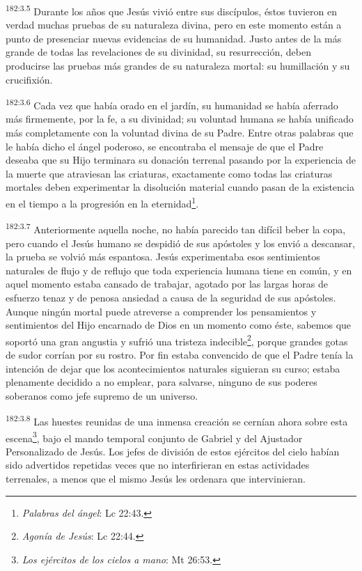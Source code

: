 \par 
\textsuperscript{182:3.5} Durante los años que Jesús vivió entre sus discípulos, éstos tuvieron en verdad muchas pruebas de su naturaleza divina, pero en este momento están a punto de presenciar nuevas evidencias de su humanidad. Justo antes de la más grande de todas las revelaciones de su divinidad, su resurrección, deben producirse las pruebas más grandes de su naturaleza mortal: su humillación y su crucifixión.

\par 
\textsuperscript{182:3.6} Cada vez que había orado en el jardín, su humanidad se había aferrado más firmemente, por la fe, a su divinidad; su voluntad humana se había unificado más completamente con la voluntad divina de su Padre. Entre otras palabras que le había dicho el ángel poderoso, se encontraba el mensaje de que el Padre deseaba que su Hijo terminara su donación terrenal pasando por la experiencia de la muerte que atraviesan las criaturas, exactamente como todas las criaturas mortales deben experimentar la disolución material cuando pasan de la existencia en el tiempo a la progresión en la eternidad\footnote{\textit{Palabras del ángel}: Lc 22:43.}.

\par 
\textsuperscript{182:3.7} Anteriormente aquella noche, no había parecido tan difícil beber la copa, pero cuando el Jesús humano se despidió de sus apóstoles y los envió a descansar, la prueba se volvió más espantosa. Jesús experimentaba esos sentimientos naturales de flujo y de reflujo que toda experiencia humana tiene en común, y en aquel momento estaba cansado de trabajar, agotado por las largas horas de esfuerzo tenaz y de penosa ansiedad a causa de la seguridad de sus apóstoles. Aunque ningún mortal puede atreverse a comprender los pensamientos y sentimientos del Hijo encarnado de Dios en un momento como éste, sabemos que soportó una gran angustia y sufrió una tristeza indecible\footnote{\textit{Agonía de Jesús}: Lc 22:44.}, porque grandes gotas de sudor corrían por su rostro. Por fin estaba convencido de que el Padre tenía la intención de dejar que los acontecimientos naturales siguieran su curso; estaba plenamente decidido a no emplear, para salvarse, ninguno de sus poderes soberanos como jefe supremo de un universo.

\par 
\textsuperscript{182:3.8} Las huestes reunidas de una inmensa creación se cernían ahora sobre esta escena\footnote{\textit{Los ejércitos de los cielos a mano}: Mt 26:53.}, bajo el mando temporal conjunto de Gabriel y del Ajustador Personalizado de Jesús. Los jefes de división de estos ejércitos del cielo habían sido advertidos repetidas veces que no interfirieran en estas actividades terrenales, a menos que el mismo Jesús les ordenara que intervinieran.

